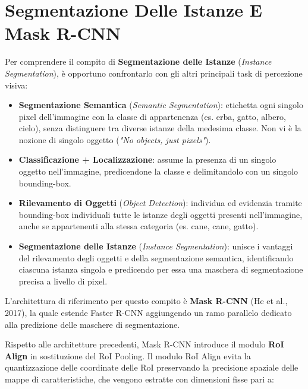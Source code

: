 ﻿\documentclass[11pt, a4paper]{article}
\begin{document}
\section{Segmentazione Delle Istanze E Mask R-CNN}

Per comprendere il compito di \textbf{Segmentazione delle Istanze} (\emph{Instance Segmentation}), è opportuno confrontarlo con gli altri principali task di percezione visiva:
\begin{itemize}
    \item \textbf{Segmentazione Semantica} (\emph{Semantic Segmentation}): etichetta ogni singolo pixel dell'immagine con la classe di appartenenza (es. erba, gatto, albero, cielo), senza distinguere tra diverse istanze della medesima classe. Non vi è la nozione di singolo oggetto (\emph{"No objects, just pixels"}).
    \item \textbf{Classificazione + Localizzazione}: assume la presenza di un singolo oggetto nell'immagine, predicendone la classe e delimitandolo con un singolo bounding-box.
    \item \textbf{Rilevamento di Oggetti} (\emph{Object Detection}): individua ed evidenzia tramite bounding-box individuali tutte le istanze degli oggetti presenti nell'immagine, anche se appartenenti alla stessa categoria (es. cane, cane, gatto).
    \item \textbf{Segmentazione delle Istanze} (\emph{Instance Segmentation}): unisce i vantaggi del rilevamento degli oggetti e della segmentazione semantica, identificando ciascuna istanza singola e predicendo per essa una maschera di segmentazione precisa a livello di pixel.
\end{itemize}


L'architettura di riferimento per questo compito è \textbf{Mask R-CNN} (He et al., 2017), la quale estende Faster R-CNN aggiungendo un ramo parallelo dedicato alla predizione delle maschere di segmentazione.

Rispetto alle architetture precedenti, Mask R-CNN introduce il modulo \textbf{RoI Align} in sostituzione del RoI Pooling. Il modulo RoI Align evita la quantizzazione delle coordinate delle RoI preservando la precisione spaziale delle mappe di caratteristiche, che vengono estratte con dimensioni fisse pari a:
\end{document}
